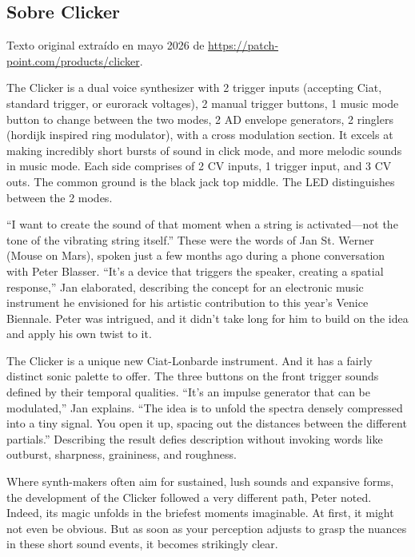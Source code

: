 \newpage

\subsection{Sobre Clicker}

Texto original extraído en mayo 2026 de \url{https://patch-point.com/products/clicker}.

The Clicker is a dual voice synthesizer with 2 trigger inputs (accepting Ciat, standard trigger, or eurorack voltages), 2 manual trigger buttons, 1 music mode button to change between the two modes, 2 AD envelope generators, 2 ringlers (hordijk inspired ring modulator), with a cross modulation section. It excels at making incredibly short bursts of sound in click mode, and more melodic sounds in music mode.  Each side comprises of 2 CV inputs, 1 trigger input, and 3 CV outs. The common ground is the black jack top middle.  The LED distinguishes between the 2 modes.

“I want to create the sound of that moment when a string is activated—not the tone of the vibrating string itself.” These were the words of Jan St. Werner (Mouse on Mars), spoken just a few months ago during a phone conversation with Peter Blasser. “It's a device that triggers the speaker, creating a spatial response,” Jan elaborated, describing the concept for an electronic music instrument he envisioned for his artistic contribution to this year's Venice Biennale. Peter was intrigued, and it didn't take long for him to build on the idea and apply his own twist to it. 

The Clicker is a unique new Ciat-Lonbarde instrument. And it has a fairly distinct sonic palette to offer. The three buttons on the front trigger sounds defined by their temporal qualities. “It's an impulse generator that can be modulated,” Jan explains. “The idea is to unfold the spectra densely compressed into a tiny signal. You open it up, spacing out the distances between the different partials.” Describing the result defies description without invoking words like outburst, sharpness, graininess, and roughness.

Where synth-makers often aim for sustained, lush sounds and expansive forms, the development of the Clicker followed a very different path, Peter noted. Indeed, its magic unfolds in the briefest moments imaginable. At first, it might not even be obvious. But as soon as your perception adjusts to grasp the nuances in these short sound events, it becomes strikingly clear.

